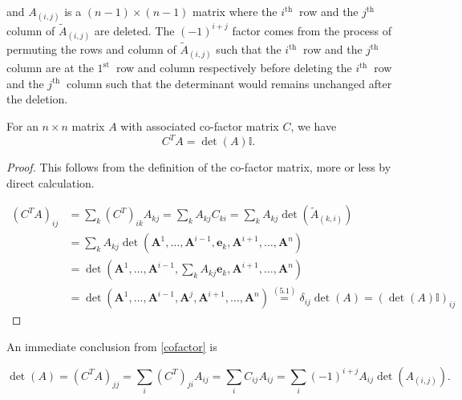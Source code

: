 \documentclass[a4paper,12pt]{report}
\begin{document}
and \(A_{(i,j)} \) is a \((n-1)\times (n-1)\) matrix where the \(i^{\text{th }} \) row and the \(j^{\text{th }} \) column of \(\tilde{A}_{(i,j)}  \)  are deleted. The \((-1)^{i+j} \) factor comes from the process of permuting the rows and column of \(\tilde{A}_{(i,j)}  \) such that the \(i^{\text{th }} \) row and the \(j^{\text{th }} \) column are at the \(1^{\text{st } }\) row and column respectively before deleting the \(i^{\text{th }} \) row and the \(j^{\text{th }} \) column such that the determinant would remains unchanged after the deletion.

\begin{lemma} \label{cofactor} 
For an \(n \times  n\) matrix \(A\) with associated co-factor matrix \(C\), we have 
\begin{equation}
    C^{T} A = \det (A) \mathbb{I}. 
\end{equation}
 
\end{lemma}

\begin{proof}
    This follows from the definition of the co-factor matrix, more or less by direct calculation. 

    \begin{equation}
    \begin{aligned}
    (C^T A)_{ij} &= \sum_k (C^T)_{ik} A_{kj} = \sum_k A_{kj} C_{ki} = \sum_k A_{kj} \det(\tilde{A}_{(k,i)}) \\
    &= \sum_k A_{kj} \det(\mathbf{A}^1, \ldots, \mathbf{A}^{i-1}, \mathbf{e}_k, \mathbf{A}^{i+1}, \ldots, \mathbf{A}^n) \\
    &= \det\left(\mathbf{A}^1, \ldots, \mathbf{A}^{i-1}, \sum_k A_{kj} \mathbf{e}_k, \mathbf{A}^{i+1}, \ldots, \mathbf{A}^n\right) \\
    &= \det(\mathbf{A}^1, \ldots, \mathbf{A}^{i-1}, \mathbf{A}^j, \mathbf{A}^{i+1}, \ldots, \mathbf{A}^n) \overset{(5.1)}{=} \delta_{ij} \det(A) = (\det(A) \mathbb{I})_{ij}
    \end{aligned}
    \end{equation}
    

\end{proof}

An immediate conclusion from \cref{cofactor}  is

\begin{equation}
\det(A) = (C^T A)_{jj} = \sum_i (C^T)_{ji} A_{ij} = \sum_i C_{ij} A_{ij} = \sum_i (-1)^{i+j} A_{ij} \det(A_{(i,j)}).
\end{equation}
\end{document}

